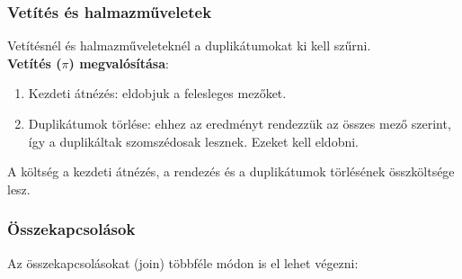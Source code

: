 \documentclass[margin=0px]{article}
\begin{document}
\subsubsection{Vetítés és halmazműveletek}

Vetítésnél és halmazműveleteknél a duplikátumokat ki kell szűrni.\\

\noindent \textbf{Vetítés ($\pi$) megvalósítása}:

\begin{enumerate}
    \item	Kezdeti átnézés: eldobjuk a felesleges mezőket.
    \item	Duplikátumok törlése: ehhez az eredményt rendezzük az összes mező szerint, így a duplikáltak szomszédosak
          lesznek. Ezeket kell eldobni.
\end{enumerate}

\noindent A költség a kezdeti átnézés, a rendezés és a duplikátumok törlésének összköltsége lesz.

\subsubsection{Összekapcsolások}

Az összekapcsolásokat (join) többféle módon is el lehet végezni:
\end{document}
